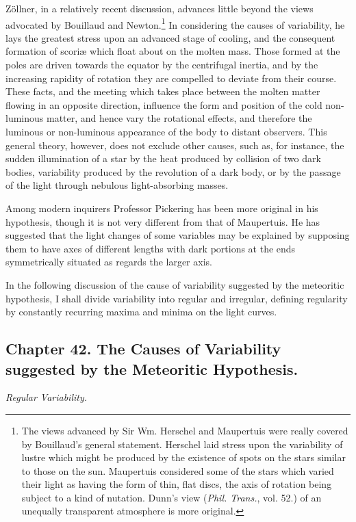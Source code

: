 \documentclass[a4paper, 12pt, oneside, polutonikogreek, english]{article}
\begin{document}
Zöllner, in a relatively recent discussion, advances little beyond the views advocated by Bouillaud and Newton.\footnote{The views advanced by Sir Wm. Herschel and Maupertuis were really covered by Bouillaud's general statement. Herschel laid stress upon the variability of lustre which might be produced by the existence of spots on the stars similar to those on the sun. Maupertuis considered some of the stars which varied their light as having the form of thin, flat discs, the axis of rotation being subject to a kind of nutation. Dunn's view (\emph{Phil. Trans.}, vol. 52.) of an unequally transparent atmosphere is more original.} In considering the causes of variability, he lays the greatest stress upon an advanced stage of cooling, and the consequent formation of scoriæ which float about on the molten mass. Those formed at the poles are driven towards the equator by the centrifugal inertia, and by the increasing rapidity of rotation they are compelled to deviate from their course. These facts, and the meeting which takes place between the molten matter flowing in an opposite direction, influence the form and position of the cold non-luminous matter, and hence vary the rotational effects, and therefore the luminous or non-luminous appearance of the body to distant observers. This general theory, however, does not exclude other causes, such as, for instance, the sudden illumination of a star by the heat produced by collision of two dark bodies, variability produced by the revolution of a dark body, or by the passage of the light through nebulous light-absorbing masses.

Among modern inquirers Professor Pickering has been more original in his hypothesis, though it is not very different from that of Maupertuis. He has suggested that the light changes of some variables may be explained by supposing them to have axes of different lengths with dark portions at the ends symmetrically situated as regards the larger axis.

In the following discussion of the cause of variability suggested by the meteoritic hypothesis, I shall divide variability into regular and irregular, defining regularity by constantly recurring maxima and minima on the light curves.
\clearpage
\subsection{Chapter 42. The Causes of Variability suggested by the Meteoritic Hypothesis.}
\begin{center}
\emph{Regular Variability.}
\end{center}
\end{document}
